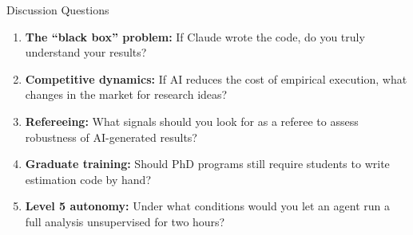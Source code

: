 \documentclass[aspectratio=169,10pt]{beamer}
\begin{document}
\begin{frame}{Discussion Questions}
\begin{enumerate}\itemsep6pt
    \item \textbf{The ``black box'' problem:} If Claude wrote the code, do you truly understand your results?

    \item \textbf{Competitive dynamics:} If AI reduces the cost of empirical execution, what changes in the market for research ideas?

    \item \textbf{Refereeing:} What signals should you look for as a referee to assess robustness of AI-generated results?

    \item \textbf{Graduate training:} Should PhD programs still require students to write estimation code by hand?

    \item \textbf{Level 5 autonomy:} Under what conditions would you let an agent run a full analysis unsupervised for two hours?
\end{enumerate}
\end{frame}
\end{document}
